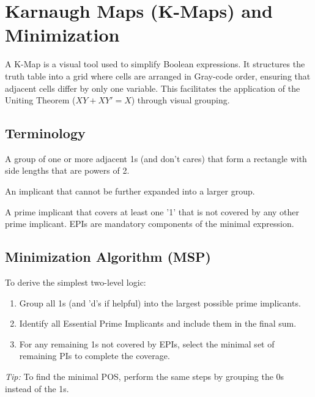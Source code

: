 \section{Karnaugh Maps (K-Maps) and Minimization}

\begin{definition}
A K-Map is a visual tool used to simplify Boolean expressions. It structures the truth table into a grid where cells are arranged in Gray-code order, ensuring that adjacent cells differ by only one variable. This facilitates the application of the Uniting Theorem ($XY + XY' = X$) through visual grouping.
\end{definition}

\subsection{Terminology}
\begin{vocabulary}[Implicant]
A group of one or more adjacent 1s (and don't cares) that form a rectangle with side lengths that are powers of 2.
\end{vocabulary}

\begin{vocabulary}
An implicant that cannot be further expanded into a larger group.
\end{vocabulary}

\begin{vocabulary}
A prime implicant that covers at least one '1' that is not covered by any other prime implicant. EPIs are mandatory components of the minimal expression.
\end{vocabulary}

\subsection{Minimization Algorithm (MSP)}
\begin{example}
To derive the simplest two-level logic:
\begin{enumerate}
    \item Group all 1s (and 'd's if helpful) into the largest possible prime implicants.
    \item Identify all Essential Prime Implicants and include them in the final sum.
    \item For any remaining 1s not covered by EPIs, select the minimal set of remaining PIs to complete the coverage.
\end{enumerate}
\textit{Tip:} To find the minimal POS, perform the same steps by grouping the 0s instead of the 1s.
\end{example}

